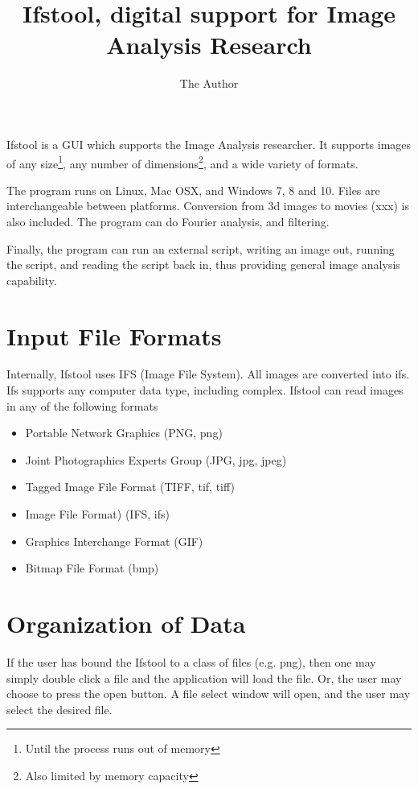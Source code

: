 \documentclass[11pt]{amsart}
\title{Ifstool, digital support for Image Analysis Research}
\author{The Author}
\begin{document}
\maketitle
Ifstool is a GUI which supports the Image Analysis researcher. It supports images of any size\footnote{Until the process runs out of memory}, any number of dimensions\footnote{Also limited by memory capacity}, and a wide variety of formats. 

The program runs on Linux, Mac OSX, and Windows 7, 8 and 10. Files are interchangeable between platforms. Conversion from 3d images to movies (xxx) is also included. The program can do  Fourier analysis, and filtering.

Finally, the program can run an external script, writing an image out, running the script, and reading the script back in, thus providing general image analysis capability.

\section{Input File Formats}
Internally, Ifstool uses IFS (Image File System). All images are converted into ifs. Ifs supports any computer data type, including complex. Ifstool can read images in any of the following formats

\begin{itemize}
\item Portable Network Graphics (PNG, png)
\item Joint Photographics Experts Group (JPG, jpg, jpeg)
\item Tagged Image File Format (TIFF, tif, tiff)
\item Image File Format) (IFS, ifs)
\item Graphics Interchange Format (GIF)
\item Bitmap File Format (bmp)
\end{itemize}

\section{Organization of Data}
If the user has bound the Ifstool to a class of files (e.g. png), then one may simply double click  a file and the application will load the file.
Or, the user may choose to press the open  button. A file select window will open, and the user may select the desired file.
\end{document}
